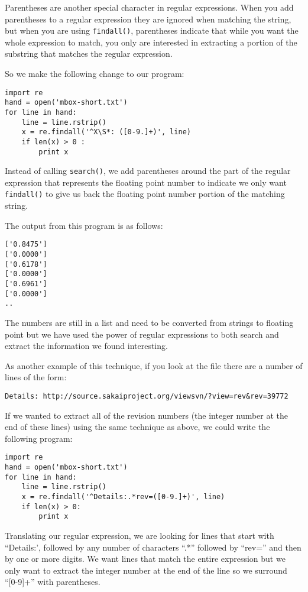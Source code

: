 Parentheses are another special character in regular expressions.  When you add parentheses to a regular expression they are ignored when matching the string, but when you are using {\tt findall()}, parentheses indicate that while you want the whole expression to match, you only are interested in extracting a portion of the substring that matches the regular expression.  

So we make the following change to our program:

\beforeverb
\begin{verbatim}
import re
hand = open('mbox-short.txt')
for line in hand:
    line = line.rstrip()
    x = re.findall('^X\S*: ([0-9.]+)', line)
    if len(x) > 0 :
        print x
\end{verbatim}
\afterverb
%
Instead of calling {\tt search()}, we add parentheses around the part of the regular expression that represents the floating point number to indicate we only want {\tt findall()} to give us back the floating point number portion of the matching string.

The output from this program is as follows:

\beforeverb
\begin{verbatim}
['0.8475']
['0.0000']
['0.6178']
['0.0000']
['0.6961']
['0.0000']
..
\end{verbatim}
\afterverb
%
The numbers are still in a list and need to be converted from strings to floating point but we have used the power of regular expressions to both search and extract the information we found interesting.

As another example of this technique, if 
you look at the file there are a number of lines of the form:

\beforeverb
\begin{verbatim}
Details: http://source.sakaiproject.org/viewsvn/?view=rev&rev=39772
\end{verbatim}
\afterverb
%
If we wanted to extract all of the revision numbers (the integer number at the end of these lines) using the same technique as above,  we could write the following program:

\beforeverb
\begin{verbatim}
import re
hand = open('mbox-short.txt')
for line in hand:
    line = line.rstrip()
    x = re.findall('^Details:.*rev=([0-9.]+)', line)
    if len(x) > 0:
        print x
\end{verbatim}
\afterverb
%
Translating our regular expression, we are looking for lines that start with ``Details:', followed by any number of characters ``.*'' followed by ``rev='' and then by one or more digits.   We want lines that match the entire expression but we only want to extract the integer number at the end of the line so we surround ``[0-9]+'' with parentheses.  


